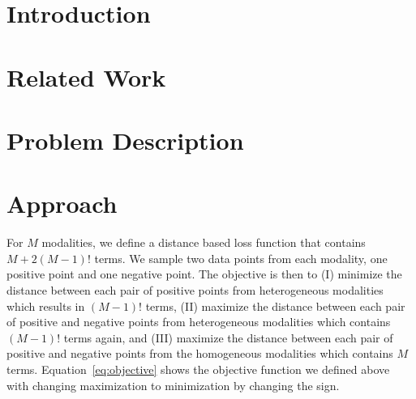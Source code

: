 \documentclass[11pt]{article}
\begin{document}
\section{Introduction}
\label{intro}




\section{Related Work}
\label{sec:Related-Work}




\section{Problem Description}
\label{sec:Problem-Description}














\section{Approach}
\label{sec:Method}

For $M$ modalities, we define a distance based loss function that contains $M+2(M-1)!$ terms. 
We sample two data points from each modality, one positive point and one negative point. The objective is then to (I) minimize the distance between each pair of positive points from heterogeneous modalities which results in $(M-1)!$ terms, (II) maximize the distance between each pair of positive and negative points from heterogeneous modalities which contains $(M-1)!$ terms again, and (III) maximize the distance between each pair of positive and negative points from the homogeneous modalities which contains $M$ terms.
Equation~\ref{eq:objective} shows the objective function we defined above with changing maximization to minimization by changing the sign.
\end{document}
